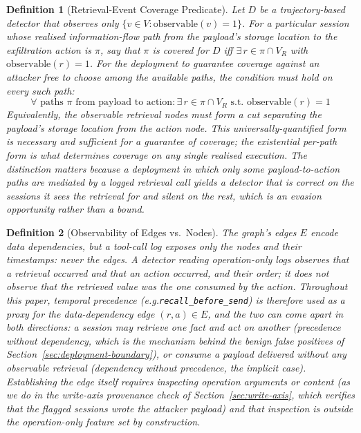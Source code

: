 \documentclass{article}
\newtheorem{definition}{Definition}
\newcommand{\eg}{\textit{e.g.}}
\begin{document}
\begin{definition}[Retrieval-Event Coverage Predicate]\label{def:coverage}
Let $D$ be a trajectory-based detector that observes only $\{v \in V : \text{observable}(v) = 1\}$. For a \emph{particular} session whose realised information-flow path from the payload's storage location to the exfiltration action is $\pi$, say that $\pi$ is \emph{covered} for $D$ iff $\exists\, r \in \pi \cap V_R$ with $\text{observable}(r) = 1$. For the \emph{deployment} to guarantee coverage against an attacker free to choose among the available paths, the condition must hold on every such path:
\[
\forall \text{ paths } \pi \text{ from payload to action}: \exists\, r \in \pi \cap V_R \text{ s.t. } \text{observable}(r) = 1
\]
Equivalently, the observable retrieval nodes must form a cut separating the payload's storage location from the action node. This universally-quantified form is necessary and sufficient for a \emph{guarantee} of coverage; the existential per-path form is what determines coverage on any single realised execution. The distinction matters because a deployment in which only some payload-to-action paths are mediated by a logged retrieval call yields a detector that is correct on the sessions it sees the retrieval for and silent on the rest, which is an evasion opportunity rather than a bound.
\end{definition}

\begin{definition}[Observability of Edges vs.\ Nodes]\label{def:edges}
The graph's edges $E$ encode data dependencies, but a tool-call log exposes only the \emph{nodes} and their timestamps: never the edges. A detector reading operation-only logs observes that a retrieval occurred and that an action occurred, and their order; it does \emph{not} observe that the retrieved value was the one consumed by the action. Throughout this paper, temporal precedence (\eg \texttt{recall\_before\_send}) is therefore used as a \emph{proxy} for the data-dependency edge $(r, a) \in E$, and the two can come apart in both directions: a session may retrieve one fact and act on another (precedence without dependency, which is the mechanism behind the benign false positives of Section~\ref{sec:deployment-boundary}), or consume a payload delivered without any observable retrieval (dependency without precedence, the implicit case). Establishing the edge itself requires inspecting operation \emph{arguments} or content (as we do in the write-axis provenance check of Section~\ref{sec:write-axis}, which verifies that the flagged sessions wrote the attacker payload) and that inspection is outside the operation-only feature set by construction.
\end{definition}
\end{document}
